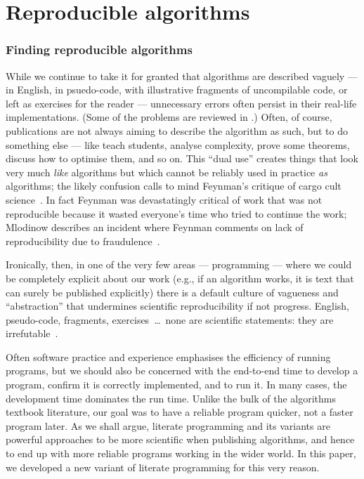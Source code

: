 \documentclass[preprint,times]{elsarticle}
\begin{document}
\part{Reproducible algorithms}
\section{Finding reproducible algorithms}\label{new-approach}
While we continue to take it for granted that algorithms are described vaguely --- in English, in psuedo-code, with illustrative fragments of uncompilable code, or left as exercises for the reader --- unnecessary errors often persist in their real-life implementations. (Some of the problems are reviewed in \cite{jmlr,heedless}.) Often, of course, publications are not always aiming to describe the algorithm as such, but to do something else --- like teach students, analyse complexity, prove some theorems, discuss how to optimise them, and so on. This ``dual use'' creates things that look very much \emph{like\/} algorithms but which cannot be reliably used in practice \emph{as\/} algorithms; the likely confusion calls to mind Feynman's critique of cargo cult science~\cite{feynman}. In fact Feynman was devastatingly critical of work that was not reproducible because it wasted everyone's time who tried to continue the work; Mlodinow describes an incident where Feynman comments on lack of reproducibility due to fraudulence~\cite{mlod}.

Ironically, then, in one of the very few areas --- programming --- where we could be completely explicit about our work (e.g., if an algorithm works, it is text that can surely be published explicitly) there is a default culture of vagueness and ``abstraction'' that undermines scientific reproducibility if not progress. English, pseudo-code, fragments, exercises~\ldots\ none are scientific statements: they are irrefutable~\cite{popper}. 

Often software practice and experience emphasises the efficiency of running programs, but we should also be concerned with the end-to-end time to develop a program, confirm it is correctly implemented, and to run it. In many cases, the development time dominates the run time. Unlike the bulk of the algorithms textbook literature, our goal was to have a reliable program quicker, not a faster program later. As we shall argue, literate programming and its variants are powerful approaches to be more scientific when publishing algorithms, and hence to end up with more reliable programs working in the wider world. In this paper, we developed a new variant of literate programming for this very reason.
\end{document}
